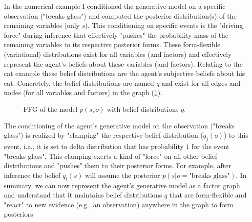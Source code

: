 In the numerical example I conditioned the generative model on a specific observation ("breaks glass") and computed the posterior distribution(s) of the remaining variables (only \(s\)). This conditioning on specific events is the "driving force" during inference that effectively "pushes" the probability mass of the remaining variables to its respective posterior forms. These form-flexible (variational) distributions exist for all variables (and factors) and effectively represent the agent's beliefs about these variables (and factors). Relating to the cat example these belief distributions are the agent's subjective beliefs about his cat. Concretely, the belief distributions are named \(q\) and exist for all edges and nodes (for all variables and factors) in the graph (\cref{fig:4}).
\begin{figure}[htbp]
    \centering


    \caption{FFG of the model \(p(s,o)\) with belief distributions \(q\).}
    \label{fig:4}
\end{figure}

The conditioning of the agent's generative model on the observation ("breaks glass") is realized by "clamping" the respective belief distribution (\(q_j(o)\)) to this event, i.e., it is set to delta distribution that has probability \(1\) for the event "breaks glass". This clamping exerts a kind of "force" on all other belief distributions and "pushes" them to their posterior forms. For example, after inference the belief \(q_i(s)\) will assume the posterior \(p(s|o=\text{"breaks glass"})\). In summary, we can now represent the agent's generative model as a factor graph and understand that it maintains belief distributions \(q\) that are form-flexible and "react" to new evidence (e.g., an observation) anywhere in the graph to form posteriors

